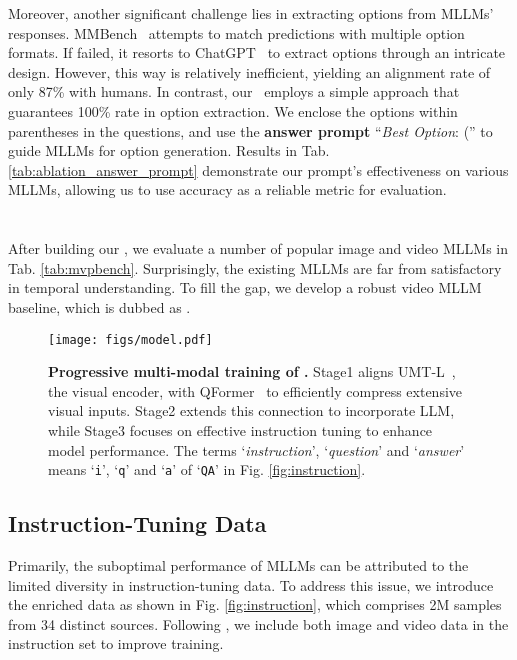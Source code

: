 Moreover,
another significant challenge lies in extracting options from MLLMs' responses. 
MMBench~\cite{mmbench} attempts to match predictions with multiple option formats. 
If failed, 
it resorts to ChatGPT~\cite{chatgpt} to extract options through an intricate design. 
However, 
this way is relatively inefficient, 
yielding an alignment rate of only 87\% with humans.
In contrast,
our \BenchName\ employs a simple approach that guarantees 100\% rate in option extraction.
We enclose the options within parentheses in the questions,
and use the \textbf{answer prompt} ``\textit{Best Option}: ('' to guide MLLMs for option generation. 
Results in Tab. \ref{tab:ablation_answer_prompt} demonstrate our prompt's effectiveness on various MLLMs, 
allowing us to use accuracy as a reliable metric for evaluation.
\section{\ModelName }
\label{sec:mvpchat}

After building our \BenchName,
we evaluate a number of popular image and video MLLMs in Tab. \ref{tab:mvpbench}.
Surprisingly,
the existing MLLMs are far from satisfactory in temporal understanding.
To fill the gap,
we develop a robust video MLLM baseline,
which is dubbed as \textbf{\ModelName}.

\begin{figure*}[thp]
    \centering
    \texttt{[image: figs/model.pdf]}
    \vspace{-0.3cm}
    \caption{
    \textbf{Progressive multi-modal training of \ModelName.}
    Stage1 aligns UMT-L~\cite{umt}, the visual encoder, with QFormer~\cite{blip2} to efficiently compress extensive visual inputs. 
    Stage2 extends this connection to incorporate LLM, 
    while Stage3 focuses on effective instruction tuning to enhance model performance.
    The terms `\textit{instruction}', `\textit{question}' and `\textit{answer}' means `\texttt{i}', `\texttt{q}' and `\texttt{a}' of `\texttt{QA}' in Fig. \ref{fig:instruction}.
    }
    \label{fig:model}
    \vspace{-0.3cm}
\end{figure*}

\subsection{Instruction-Tuning Data}
\label{sec:instruction_data}

Primarily, 
the suboptimal performance of MLLMs can be attributed to the limited diversity in instruction-tuning data. 
To address this issue, 
we introduce the enriched data as shown in Fig. \ref{fig:instruction}, 
which comprises 2M samples from 34 distinct sources.
Following \cite{videochat,videollama},
we include both image and video data in the instruction set to improve training.

